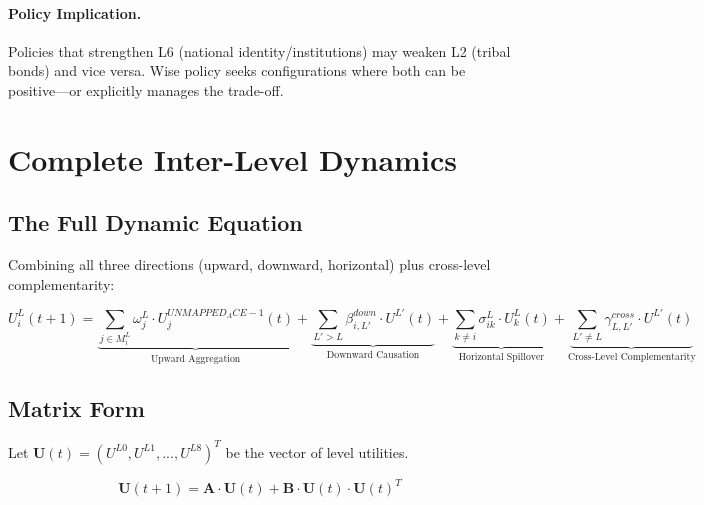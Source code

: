 \paragraph{Policy Implication.}
Policies that strengthen L6 (national identity/institutions) may weaken L2
(tribal bonds) and vice versa. Wise policy seeks configurations where both
can be positive---or explicitly manages the trade-off.

\section{Complete Inter-Level Dynamics}
\label{sec:aaa-complete-dynamics}

\subsection{The Full Dynamic Equation}

Combining all three directions (upward, downward, horizontal) plus cross-level
complementarity:

\begin{tcolorbox}[colback=green!5!white, colframe=green!50!black, title=Complete Inter-Level Utility Dynamics]
\begin{equation}
\boxed{
U^L_i(t+1) = \underbrace{\sum_{j \in M^L_i} \omega^L_j \cdot U^{UNMAPPED_ACE-1}_j(t)}_{\text{Upward Aggregation}}
+ \underbrace{\sum_{L' > L} \beta^{down}_{i,L'} \cdot U^{L'}(t)}_{\text{Downward Causation}}
+ \underbrace{\sum_{k \neq i} \sigma^L_{ik} \cdot U^L_k(t)}_{\text{Horizontal Spillover}}
+ \underbrace{\sum_{L' \neq L} \gamma^{cross}_{L,L'} \cdot U^{L'}(t)}_{\text{Cross-Level Complementarity}}
}
\label{eq:aaa-complete-dynamics}
\end{equation}
\end{tcolorbox}

\subsection{Matrix Form}

Let $\mathbf{U}(t) = (U^{L0}, U^{L1}, ..., U^{L8})^T$ be the vector of level utilities.

\begin{equation}
\mathbf{U}(t+1) = \mathbf{A} \cdot \mathbf{U}(t) + \mathbf{B} \cdot \mathbf{U}(t) \cdot \mathbf{U}(t)^T
\end{equation}

